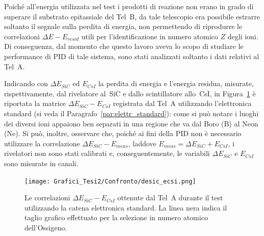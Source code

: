 Poiché all'energia utilizzata nel test i prodotti di reazione non erano in grado di superare il substrato epitassiale del Tel~B, da tale telescopio era possibile estrarre soltanto il segnale sulla perdita di energia, non permettendo di riprodurre le correlazioni $\Delta E - E_{resid}$ utili per l'identificazione in numero atomico $Z$ degli ioni.
Di conseguenza, dal momento che questo lavoro aveva lo scopo di studiare le performance di PID di tale sistema, sono stati analizzati soltanto i dati relativi al Tel~A.



Indicando con $\Delta E_{SiC}$ ed $E_{CsI}$ la perdita di energia e l'energia residua, misurate, rispettivamente, dal rivelatore al~SiC e dallo scintillatore allo~CsI, in Figura~\ref{fig:sic_csi_standard} è riportata la matrice $\Delta E_{SiC} - E_{CsI}$ registrata dal Tel~A utilizzando l'elettronica standard (si veda il Paragrafo~\ref{par:elettr_standard}): come si può notare i luoghi dei diversi ioni appaiono ben separati in una regione che va dal Boro (B) al Neon (Ne).
Si può, inoltre, osservare che, poiché ai fini della PID non è necessario utilizzare la correlazione $\Delta E_{SiC} - E_{meas}$, laddove $E_{meas} = \Delta E_{SiC} + E_{CsI}$, i rivelatori non sono stati calibrati e, conseguentemente, le variabili $\Delta E_{SiC}$ e $E_{CsI}$ sono misurate in canali.


\begin{figure} [!p]
	\centering
	\texttt{[image: Grafici\_Tesi2/Confronto/desic\_ecsi.png]}
	\caption{Le correlazioni $\Delta E_{SiC} - E_{CsI}$ ottenute dal Tel~A durante il test utilizzando la catena elettronica standard. La linea nera indica il taglio grafico effettuato per la selezione in numero atomico dell'Ossigeno.} \label{fig:sic_csi_standard}
\end{figure}





